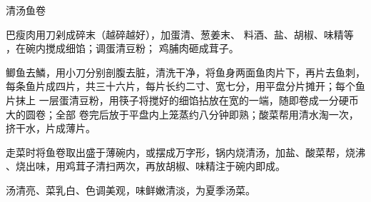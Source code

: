 \begin{recipe}{清汤鱼卷}

\ingredients


\cooking

\step 巴瘦肉用刀剁成碎末（越碎越好），加蛋清、葱姜末、 料酒、盐、胡椒、味精等
，在碗内搅成细馅；调蛋清豆粉； 鸡脯肉砸成茸子。

\step 鲫鱼去鱗，用小刀分别剖腹去脏，清洗干净，将鱼身两面鱼肉片下，再片去鱼刺，
每条鱼片成四片，共三十六片，每片长约二寸、宽七分，用平盘分片摊开；每个鱼片抹上
一层蛋清豆粉，用筷子将搅好的细馅拈放在宽的一端，随即卷成一分硬币大的圆卷；全部
卷完后放于平盘内上笼蒸约八分钟即熟；酸菜帮用清水淘一次，挤干水，片成薄片。

\step 走菜时将鱼卷取出盛于薄碗内，或摆成万字形，锅内烧清汤，加盐、酸菜帮，烧沸
、烧出味，用鸡茸子清扫两次，再放胡椒、味精注于碗内即成。

\features

汤清亮、菜乳白、色调美观，味鲜嫩清淡，为夏季汤菜。

\end{recipe}

